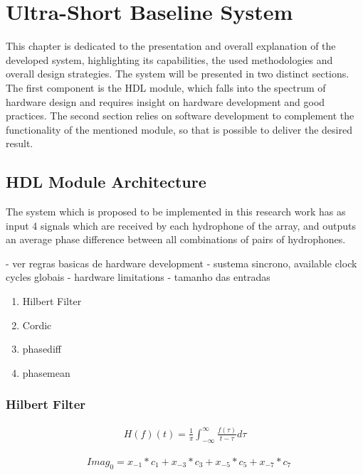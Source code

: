\chapter{Ultra-Short Baseline System} \label{chap:proposed_sys}

This chapter is dedicated to the presentation and overall explanation of the developed system, highlighting its capabilities, the used methodologies and overall design strategies. 
The system will be presented in two distinct sections. The first component is the HDL module, which falls into the spectrum of hardware design and requires insight on hardware development and good practices. The second section relies on software development to complement the functionality of the mentioned module, so that is possible to deliver the desired result.

\section{HDL Module Architecture} \label{subchap:HDL module}

The system which is proposed to be implemented in this research work has as input 4 signals which are received by each hydrophone of the array, and outputs an average phase difference between all combinations of pairs of hydrophones. 

- ver regras basicas de hardware development
- sustema sincrono, available clock cycles globais
- hardware limitations
- tamanho das entradas


\begin{enumerate}
	\item Hilbert Filter
	\item Cordic
	\item phasediff
	\item phasemean
\end{enumerate}

\subsection{Hilbert Filter}


\begin{eqnarray}
H(f)(t) = \frac{1}{\pi}\int_{-\infty}^{\infty}\frac{f(\tau)}{t-\tau}d\tau
\label{eq:hilbert_integral}
\end{eqnarray}

\begin{eqnarray}
&Imag_0 = x_{-1}*c_1 + x_{-3}*c_3 + x_{-5}*c_5 + x_{-7}*c_7
\label{eq:hilbert_imeq}
\end{eqnarray}

